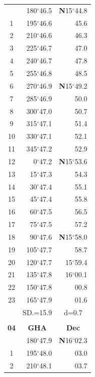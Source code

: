 \documentclass[10pt, a4paper]{report}
\begin{document}
\begin{scriptsize}
\begin{tabular*}{0.2\textwidth}[t]{@{\extracolsep{\fill}}|c|rr|}
\hline\rule{0pt}{2.6ex}\noindent
0 & 180$^\circ$46.5 & \textbf{N}15$^\circ$44.8\\
1 & 195$^\circ$46.6 & 45.6\\
2 & 210$^\circ$46.6 & 46.3\\
3 & 225$^\circ$46.7 & \raisebox{0.24ex}{\boldmath$\cdot$~\boldmath$\cdot$~~}47.0\\
4 & 240$^\circ$46.7 & 47.8\\
5 & 255$^\circ$46.8 & 48.5\\[2Pt]
6 & 270$^\circ$46.9 & \textbf{N}15$^\circ$49.2\\
7 & 285$^\circ$46.9 & 50.0\\
8 & 300$^\circ$47.0 & 50.7\\
9 & 315$^\circ$47.1 & \raisebox{0.24ex}{\boldmath$\cdot$~\boldmath$\cdot$~~}51.4\\
10 & 330$^\circ$47.1 & 52.1\\
11 & 345$^\circ$47.2 & 52.9\\[2Pt]
12 & 0$^\circ$47.2 & \textbf{N}15$^\circ$53.6\\
13 & 15$^\circ$47.3 & 54.3\\
14 & 30$^\circ$47.4 & 55.1\\
15 & 45$^\circ$47.4 & \raisebox{0.24ex}{\boldmath$\cdot$~\boldmath$\cdot$~~}55.8\\
16 & 60$^\circ$47.5 & 56.5\\
17 & 75$^\circ$47.5 & 57.2\\[2Pt]
18 & 90$^\circ$47.6 & \textbf{N}15$^\circ$58.0\\
19 & 105$^\circ$47.7 & 58.7\\
20 & 120$^\circ$47.7 & 15$^\circ$59.4\\
21 & 135$^\circ$47.8 & 16$^\circ$00.1\\
22 & 150$^\circ$47.8 & 00.8\\
23 & 165$^\circ$47.9 & 01.6\\
\hline
\rule{0pt}{2.4ex} & \multicolumn{1}{c}{SD.=15.9} & \multicolumn{1}{c|}{d=0.7}\\
\hline
\multicolumn{1}{c}{}\\[-0.5ex]\hline
\multicolumn{1}{|c|}{\rule{0pt}{2.6ex}\textbf{04}} & \multicolumn{1}{c}{\textbf{GHA}} & \multicolumn{1}{c|}{\textbf{Dec}}\\
\hline\rule{0pt}{2.6ex}\noindent
0 & 180$^\circ$47.9 & \textbf{N}16$^\circ$02.3\\
1 & 195$^\circ$48.0 & 03.0\\
2 & 210$^\circ$48.1 & 03.7\\

\end{tabular*}
\end{scriptsize}
\end{document}
